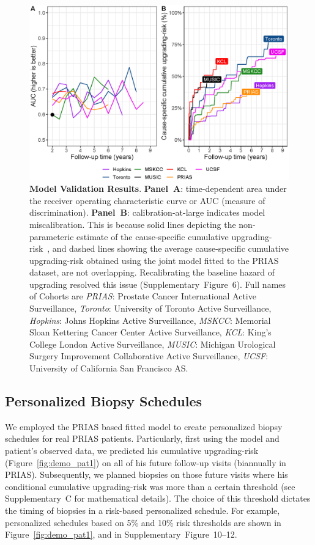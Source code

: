 \begin{figure}
\centerline{\includegraphics[width=\columnwidth]{images/auc_beforecalib.eps}}
\caption{\textbf{Model Validation Results}. \textbf{Panel~A}: time-dependent area under the receiver operating characteristic curve or AUC (measure of discrimination). \textbf{Panel~B}: calibration-at-large indicates model miscalibration. This is because solid lines depicting the non-parameteric estimate of the cause-specific cumulative upgrading-risk~\citep{turnbull1976empirical}, and dashed lines showing the average cause-specific cumulative upgrading-risk obtained using the joint model fitted to the PRIAS dataset, are not overlapping. Recalibrating the baseline hazard of upgrading resolved this issue (Supplementary~Figure~6). Full names of Cohorts are \textit{PRIAS}: Prostate Cancer International Active Surveillance, \textit{Toronto}: University of Toronto Active Surveillance, \textit{Hopkins}: Johns Hopkins Active Surveillance, \textit{MSKCC}: Memorial Sloan Kettering Cancer Center Active Surveillance, \textit{KCL}: King's College London Active Surveillance, \textit{MUSIC}: Michigan Urological Surgery Improvement Collaborative Active Surveillance, \textit{UCSF}: University of California San Francisco AS.}
\label{fig:auc_beforecalib}
\end{figure}

\subsection{Personalized Biopsy Schedules}
We employed the PRIAS based fitted model to create personalized biopsy schedules for real PRIAS patients. Particularly, first using the model and patient's observed data, we predicted his cumulative upgrading-risk (Figure~\ref{fig:demo_pat1}) on all of his future follow-up visits (biannually in PRIAS). Subsequently, we planned biopsies on those future visits where his conditional cumulative upgrading-risk was more than a certain threshold (see Supplementary~C for mathematical details). The choice of this threshold dictates the timing of biopsies in a risk-based personalized schedule. For example, personalized schedules based on 5\% and 10\% risk thresholds are shown in Figure~\ref{fig:demo_pat1}, and in Supplementary~Figure~10--12. 

